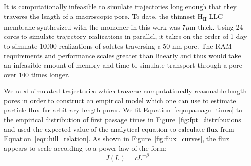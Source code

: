 \documentclass{article}
\begin{document}
 

  It is computationally infeasible to simulate trajectories long enough that they
  traverse the length of a macroscopic pore. To date, the thinnest H\textsubscript{II}
  LLC membrane synthesized with the monomer in this work was 7$\mu$m thick. Using
  24 cores to simulate trajectory realizations in parallel, it takes on the order 
  of 1 day to simulate 10000 realizations of solutes traversing a 50 nm pore. The 
  RAM requirements and performance scales greater than linearly and thus would 
  take an infeasible amount of memory and time to simulate transport through a 
  pore over 100 times longer.
  
  We used simulated trajectories which traverse computationally-reasonable length
  pores in order to construct an empirical model which one can use to estimate 
  particle flux for arbitrary length pores. We fit Equation~\ref{eqn:passage_times}
  to the empirical distribution of first passage times in Figure~\ref{fig:fpt_distributions}
  and used the expected value of the analytical equation to calculate flux from 
  Equation~\ref{eqn:hill_relation}. As shown in Figure~\ref{fig:flux_curves}, 
  the flux appears to scale according to a power law of the form:
  \begin{equation}
  J(L) = cL^{-\beta} 
  \label{eqn:flux_decay}
  \end{equation}
  
\end{document}
